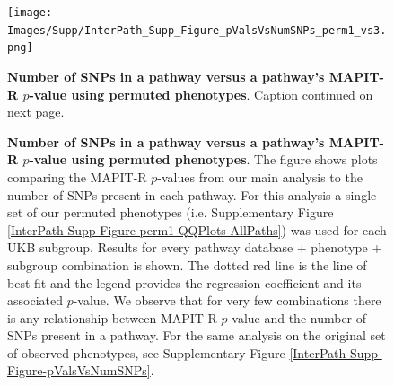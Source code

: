 \documentclass[12pt,a4paper]{article}
\def\log{{\rm log}}
\begin{document}
\setlength{\footskip}{3cm}
\begin{figure}[htbp]
\centering
\vspace*{-2cm}
\texttt{[image: Images/Supp/InterPath\_Supp\_Figure\_pValsVsNumSNPs\_perm1\_vs3.png]}
\caption[TBD]{\textbf{Number of SNPs in a pathway versus a pathway's MAPIT-R $p$-value using permuted phenotypes}. Caption continued on next page.}
\label{InterPath-Supp-Figure-pValsVsNumSNPs-perm1}
\end{figure}
\clearpage
\setlength{\footskip}{1cm}

\addtocounter{figure}{-1}
\begin{figure} [t!]
  \caption{\textbf{Number of SNPs in a pathway versus a pathway's MAPIT-R $p$-value using permuted phenotypes}. The figure shows plots comparing the MAPIT-R $p$-values from our main analysis to the number of SNPs present in each pathway. For this analysis a single set of our permuted phenotypes (i.e. Supplementary Figure \ref{InterPath-Supp-Figure-perm1-QQPlots-AllPaths}) was used for each UKB subgroup. Results for every pathway database + phenotype + subgroup combination is shown. The dotted red line is the line of best fit and the legend provides the regression coefficient and its associated $p$-value. We observe that for very few combinations there is any relationship between MAPIT-R $p$-value and the number of SNPs present in a pathway. For the same analysis on the original set of observed phenotypes, see Supplementary Figure \ref{InterPath-Supp-Figure-pValsVsNumSNPs}.}
\label{InterPath-Supp-Figure-pValsVsNumSNPs-perm1-Caption}
\end{figure}
\clearpage

\end{document}
